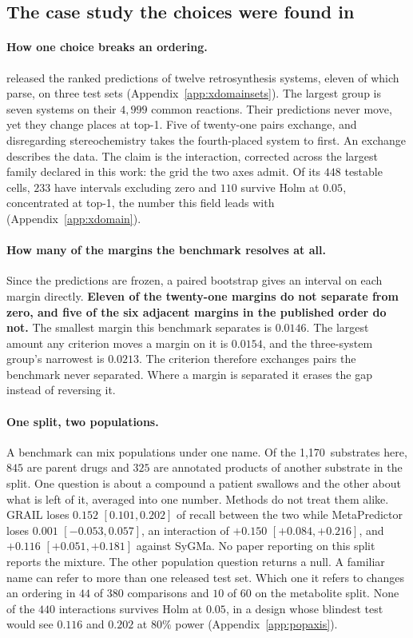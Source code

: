 \documentclass{article}
\newcommand{\ntest}{1{,}170}          %
\begin{document}
\subsection{The case study the choices were found in}
\label{sec:case}

\paragraph{How one choice breaks an ordering.} 
\citet{Hastedt_2024} released the ranked predictions of twelve retrosynthesis systems, eleven of
which parse, on three test sets (Appendix~\ref{app:xdomainsets}). The largest group is seven systems
on their $4{,}999$ common reactions. Their predictions never move, yet they change places at top-1.
Five of twenty-one pairs exchange, and disregarding stereochemistry takes the fourth-placed system
to first. An exchange describes the data. The claim is the interaction, corrected across the largest
family declared in this work: the grid the two axes admit. Of its $448$ testable cells, $233$ have
intervals excluding zero and $110$ survive Holm at $0.05$, concentrated at top-1, the number this
field leads with (Appendix~\ref{app:xdomain}).

\paragraph{How many of the margins the benchmark resolves at all.} Since the predictions are
frozen, a paired bootstrap gives an interval on each margin directly. \textbf{Eleven of the
twenty-one margins do not separate from zero, and five of the six adjacent margins in the published
order do not.} The smallest margin this benchmark separates is $0.0146$. The largest amount any
criterion moves a margin on it is $0.0154$, and the three-system group's narrowest is $0.0213$. The
criterion therefore exchanges pairs the benchmark never separated. Where a margin is separated it
erases the gap instead of reversing it.

\paragraph{One split, two populations.} A benchmark can mix populations under one name. Of the
\ntest\ substrates here, $845$ are parent drugs and $325$ are annotated products of another
substrate in the split. One question is about a compound a patient swallows and the other about what
is left of it, averaged into one number. Methods do not treat them alike. GRAIL loses $0.152$
$[0.101,0.202]$ of recall between the two while MetaPredictor loses $0.001$ $[-0.053,0.057]$, an
interaction of $+0.150$ $[+0.084,+0.216]$, and $+0.116$ $[+0.051,+0.181]$ against SyGMa. No paper
reporting on this split reports the mixture. The other population question returns a null. A
familiar name can refer to more than one released test set. Which one it refers to changes an
ordering in $44$ of $380$ comparisons and $10$ of $60$ on the metabolite split. None of the $440$
interactions survives Holm at $0.05$, in a design whose blindest test would see $0.116$ and $0.202$
at $80\%$ power (Appendix~\ref{app:popaxis}).
\end{document}
